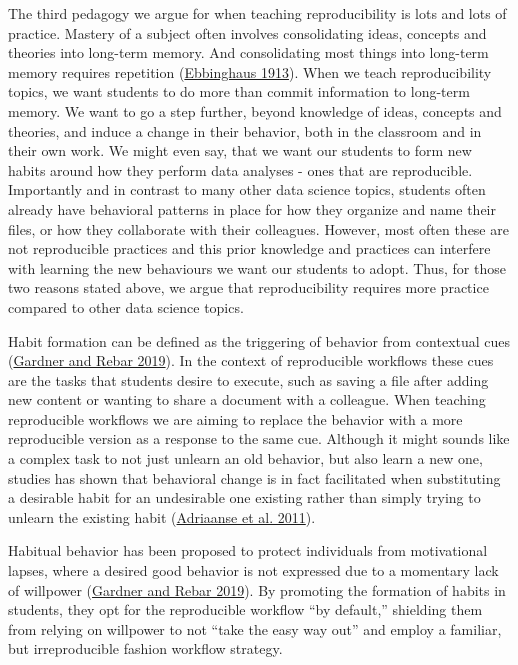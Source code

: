 \documentclass{article}
\begin{document}
The third pedagogy we argue for when teaching reproducibility is lots
and lots of practice. Mastery of a subject often involves consolidating
ideas, concepts and theories into long-term memory. And consolidating
most things into long-term memory requires repetition
(\protect\hyperlink{ref-ebbinghaus1913memory}{Ebbinghaus 1913}). When we
teach reproducibility topics, we want students to do more than commit
information to long-term memory. We want to go a step further, beyond
knowledge of ideas, concepts and theories, and induce a change in their
behavior, both in the classroom and in their own work. We might even
say, that we want our students to form new habits around how they
perform data analyses - ones that are reproducible. Importantly and in
contrast to many other data science topics, students often already have
behavioral patterns in place for how they organize and name their files,
or how they collaborate with their colleagues. However, most often these
are not reproducible practices and this prior knowledge and practices
can interfere with learning the new behaviours we want our students to
adopt. Thus, for those two reasons stated above, we argue that
reproducibility requires more practice compared to other data science
topics.

Habit formation can be defined as the triggering of behavior from
contextual cues (\protect\hyperlink{ref-rebar_gardner_2019}{Gardner and
Rebar 2019}). In the context of reproducible workflows these cues are
the tasks that students desire to execute, such as saving a file after
adding new content or wanting to share a document with a colleague. When
teaching reproducible workflows we are aiming to replace the behavior
with a more reproducible version as a response to the same cue. Although
it might sounds like a complex task to not just unlearn an old behavior,
but also learn a new one, studies has shown that behavioral change is in
fact facilitated when substituting a desirable habit for an undesirable
one existing rather than simply trying to unlearn the existing habit
(\protect\hyperlink{ref-evers_adriaanse_2011}{Adriaanse et al. 2011}).

Habitual behavior has been proposed to protect individuals from
motivational lapses, where a desired good behavior is not expressed due
to a momentary lack of willpower
(\protect\hyperlink{ref-rebar_gardner_2019}{Gardner and Rebar 2019}). By
promoting the formation of habits in students, they opt for the
reproducible workflow ``by default,'' shielding them from relying on
willpower to not ``take the easy way out'' and employ a familiar, but
irreproducible fashion workflow strategy.
\end{document}
